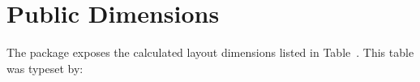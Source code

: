 \documentclass[
11pt,
a4paper,
oneside
]{scrbook}
\begin{document}
\section{Public Dimensions}

The package exposes the calculated layout dimensions listed in Table~.
%	
%	
%	
%	
%	
%	
%	
%	
%	
%	
%	
%	
%	
%	
%	
%	
This table was typeset by:


\end{document}
